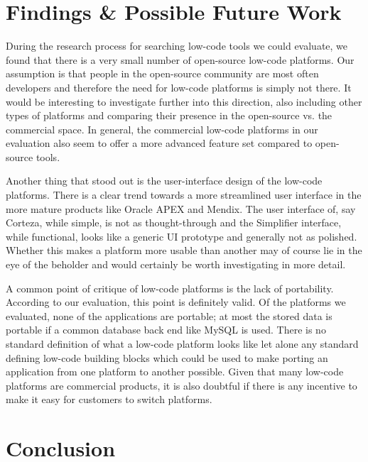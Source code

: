 \documentclass[runningheads]{llncs}
\begin{document}
\section{Findings \& Possible Future Work}
\label{sec:findings}

During the research process for searching low-code tools we could evaluate, we found that there is a very small number of open-source low-code platforms. Our assumption is that people in the open-source community are most often developers and therefore the need for low-code platforms is simply not there. It would be interesting to investigate further into this direction, also including other types of platforms and comparing their presence in the open-source vs. the commercial space. In general, the commercial low-code platforms in our evaluation also seem to offer a more advanced feature set compared to open-source tools.

Another thing that stood out is the user-interface design of the low-code platforms. There is a clear trend towards a more streamlined user interface in the more mature products like Oracle APEX and Mendix. The user interface of, say Corteza, while simple, is not as thought-through and the Simplifier interface, while functional, looks like a generic UI prototype and generally not as polished. Whether this makes a platform more usable than another may of course lie in the eye of the beholder and would certainly be worth investigating in more detail.

A common point of critique of low-code platforms is the lack of portability.~\cite{low_code_platforms_deliver_customer_facing_apps_but_will_they_scale_up, low_code_patforms_dont_buy_the_hype, the_benefits_of_implementing_low_code_development_platforms} According to our evaluation, this point is definitely valid. Of the platforms we evaluated, none of the applications are portable; at most the stored data is portable if a common database back end like MySQL is used. There is no standard definition of what a low-code platform looks like let alone any standard defining low-code building blocks which could be used to make porting an application from one platform to another possible. Given that many low-code platforms are commercial products, it is also doubtful if there is any incentive to make it easy for customers to switch platforms.

\section{Conclusion}
\label{sec:conclusion}
\end{document}
